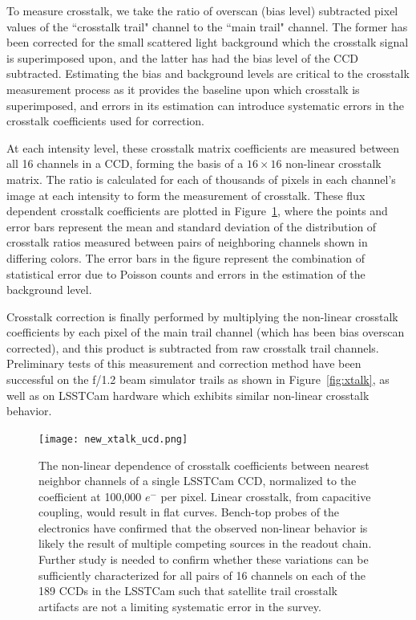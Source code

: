 \documentclass[twocolumn,trackchanges]{aastex63}
\begin{document}
To measure crosstalk, we take the ratio of overscan (bias level) subtracted pixel values of the ``crosstalk trail" channel to the ``main trail" channel. The former has been corrected for the small scattered light background which the crosstalk signal is superimposed upon, and the latter has had the bias level of the CCD subtracted. Estimating the bias and background levels are critical to the crosstalk measurement process as it provides the baseline upon which crosstalk is superimposed, and errors in its estimation can introduce systematic errors in the crosstalk coefficients used for correction. 

At each intensity level, these crosstalk matrix coefficients are measured between all 16 channels in a CCD, forming the basis of a $16\times16$ non-linear crosstalk matrix. The ratio is calculated for each of thousands of pixels in each channel’s image at each intensity to form the measurement of crosstalk. These flux dependent crosstalk coefficients are plotted in Figure~\ref{fig:relxtalk}, where the points and error bars represent the mean and standard deviation of the distribution of crosstalk ratios measured between pairs of neighboring channels shown in differing colors. The error bars in the figure represent the combination of statistical error due to Poisson counts and errors in the estimation of the background level.

Crosstalk correction is finally performed by multiplying the non-linear crosstalk coefficients by each pixel of the main trail channel (which has been bias overscan corrected), and this product is subtracted from raw crosstalk trail channels. Preliminary tests of this measurement and correction method have been successful on the f/1.2 beam simulator trails as shown in Figure~\ref{fig:xtalk}, as well as on LSSTCam hardware which exhibits similar non-linear crosstalk behavior.

\begin{figure}[ht!]
\texttt{[image: new\_xtalk\_ucd.png]}
\caption{The non-linear dependence of crosstalk coefficients between nearest neighbor channels of a single LSSTCam CCD, normalized to the coefficient at 100,000 $e^-$ per pixel.  Linear crosstalk, from capacitive coupling, would result in flat curves. Bench-top probes of the electronics have confirmed that the observed non-linear behavior is likely the result of multiple competing sources in the readout chain. Further study is needed to confirm whether these variations can be sufficiently characterized for all pairs of 16 channels on each of the 189 CCDs in the LSSTCam such that satellite trail crosstalk artifacts are not a limiting systematic error in the survey. \label{fig:relxtalk}}
\end{figure}
\end{document}
